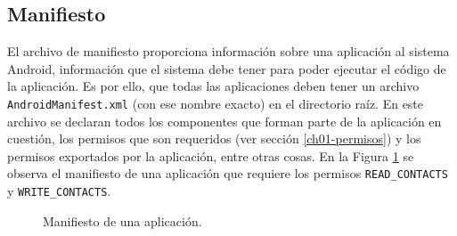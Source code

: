 \subsection{Manifiesto}
El archivo de manifiesto proporciona información sobre una aplicación al sistema Android, información que el sistema debe tener para poder ejecutar el código de la aplicación. Es por ello, que todas las aplicaciones deben tener un archivo \texttt{AndroidManifest.xml} (con ese nombre exacto) en el directorio raíz. En este archivo se declaran todos los componentes que forman parte de la aplicación en cuestión, los permisos que son requeridos (ver sección \ref{ch01-permisos}) y los permisos exportados por la aplicación, entre otras cosas. En la Figura \ref{fig:ch01:manifest} se observa el manifiesto de una aplicación que requiere los permisos \texttt{READ\_CONTACTS} y \texttt{WRITE\_CONTACTS}.
\begin{figure}[hbtp]
    \centering
    
    \caption{Manifiesto de una aplicación.}
    \label{fig:ch01:manifest}
\end{figure}